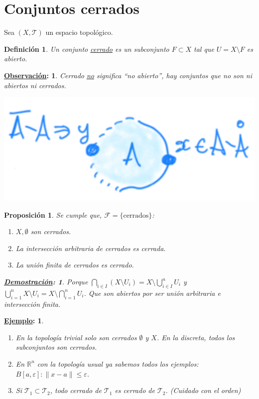 \documentclass[10pt,a4paper,openright]{book}
\theoremstyle{break}
\newtheorem*{defi}{Definición}
\newtheorem*{prop}{Proposición}
\newtheorem*{demo}{\underline{Demostración}:}
\newtheorem*{obs}{\underline{Observación}:}
\newtheorem*{ej}{\underline{Ejemplo}:}
\begin{document}
\section{Conjuntos cerrados}%
\label{sec:conjuntos_cerrados}
Sea $\left( X, \mathcal{T} \right)$ un espacio topológico.
\begin{defi}
Un conjunto \underline{cerrado} es un subconjunto $F \subset X$ tal que $U = X \setminus F$ es abierto.
\end{defi}
\begin{obs}
    Cerrado \underline{no} significa ``no abierto'', hay conjuntos que no son ni abiertos ni cerrados.
    \begin{center}
        \includegraphics[scale=0.3]{images/def_cerrados} 
    \end{center}
\end{obs}
\begin{prop}
Se cumple que, $\mathcal{F} = \{\text{cerrados}\}$:
\begin{enumerate}
    \item $X, \emptyset$ son cerrados.
    \item La intersección arbitraria de cerrados es cerrada.
    \item La unión finita de cerrados es cerrado.
\end{enumerate}
\begin{demo}
    Porque $\bigcap_{i \in  I} \left( X \setminus U_i \right) = X \setminus \bigcup_{i \in I}^n U_i$ y $\bigcup_{i = 1}^n X \setminus U_i = X \setminus \bigcap_{i = 1}^n U_i$. Que son abiertos por ser unión arbitraria e intersección finita.
\end{demo}
\end{prop}

\begin{ej}
\begin{enumerate}
    \item En la topología trivial solo son cerrados $\emptyset$ y $X$. En la discreta, todos los subconjuntos son cerrados.
    \item En $\mathbb{R}^n$ con la topología usual ya sabemos todos los ejemplos: $B\left[ a, \varepsilon \right] : \lVert x - a \rVert \le \varepsilon$.
    \item Si $\mathcal{T}_1 \subset \mathcal{T}_2$, todo cerrado de $\mathcal{T}_1$ es cerrado de $\mathcal{T}_2$. (Cuidado con el orden) 
\end{enumerate}
\end{ej}
\end{document}
